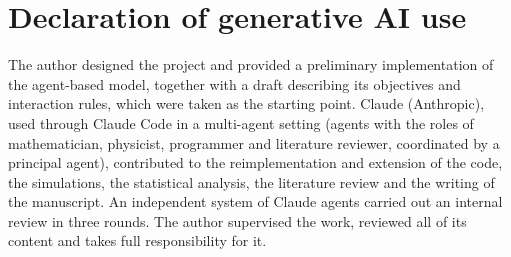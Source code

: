 \documentclass[pre,twocolumn,superscriptaddress,showpacs]{revtex4-2}
\begin{document}
\section*{Declaration of generative AI use}
The author designed the project and provided a preliminary implementation of the agent-based model, together with a
draft describing its objectives and interaction rules, which were taken as the starting point. Claude (Anthropic),
used through Claude Code in a multi-agent setting (agents with the roles of mathematician, physicist, programmer and
literature reviewer, coordinated by a principal agent), contributed to the reimplementation and extension of the
code, the simulations, the statistical analysis, the literature review and the writing of the manuscript. An
independent system of Claude agents carried out an internal review in three rounds. The author supervised the work,
reviewed all of its content and takes full responsibility for it.



\end{document}
